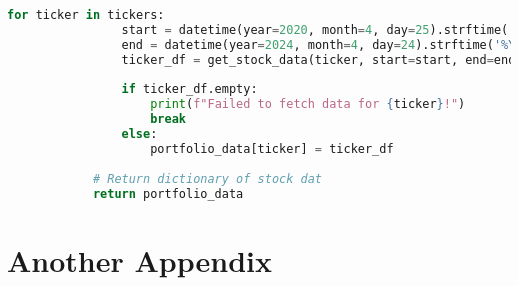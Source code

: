\documentclass{article}
\begin{document}
\begin{appendices}
\begin{lstlisting}[language=Python]
            for ticker in tickers:
                start = datetime(year=2020, month=4, day=25).strftime('%Y-%m-%d')
                end = datetime(year=2024, month=4, day=24).strftime('%Y-%m-%d')
                ticker_df = get_stock_data(ticker, start=start, end=end)
    
                if ticker_df.empty:
                    print(f"Failed to fetch data for {ticker}!")
                    break
                else:
                    portfolio_data[ticker] = ticker_df
            
            # Return dictionary of stock dat 
            return portfolio_data
    \end{lstlisting}

\section{Another Appendix}
    
\end{appendices}
\end{document}
